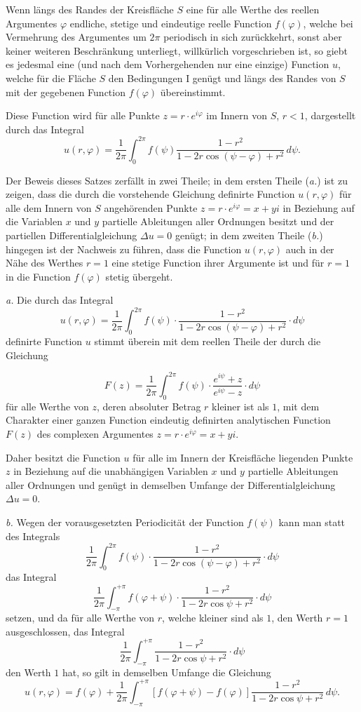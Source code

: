 \documentclass{article}
\begin{document}
Wenn längs des Randes der Kreisfläche $S$ eine für alle Werthe des reellen Argumentes $\varphi$ endliche, stetige und eindeutige reelle Function $f(\varphi)$, welche bei Vermehrung des Argumentes um $2\pi$ periodisch in sich zurückkehrt, sonst aber keiner weiteren Beschränkung unterliegt, willkürlich vorgeschrieben ist, so giebt es jedesmal eine (und nach dem Vorhergehenden nur eine einzige) Function $u$, welche für die Fläche $S$ den Bedingungen I genügt und längs des Randes von $S$ mit der gegebenen Function $f(\varphi)$ übereinstimmt.

Diese Function wird für alle Punkte $z = r \cdot e^{i\varphi}$ im Innern von $S$, $r < 1$, dargestellt durch das Integral
\[
u(r, \varphi) = \frac{1}{2\pi} \int_0^{2\pi} f(\psi) \frac{1 - r^2}{1 - 2r \cos(\psi - \varphi) + r^2}\,d\psi.
\]

Der Beweis dieses Satzes zerfällt in zwei Theile; in dem ersten Theile (\emph{a.}) ist zu zeigen, dass die durch die vorstehende Gleichung definirte Function $u(r, \varphi)$ für alle dem Innern von $S$ angehörenden Punkte $z = r \cdot e^{i\varphi} = x + yi$ in Beziehung auf die Variablen $x$ und $y$ partielle Ableitungen aller Ordnungen besitzt und der partiellen Differentialgleichung $\Delta u = 0$ genügt; in dem zweiten Theile (\emph{b.}) hingegen ist der Nachweis zu führen, dass die Function $u(r, \varphi)$ auch in der Nähe des Werthes $r = 1$ eine stetige Function ihrer Argumente ist und für $r = 1$ in die Function $f(\varphi)$ stetig übergeht.

\emph{a.} Die durch das Integral
\[
u(r, \varphi) = \frac{1}{2\pi} \int_0^{2\pi} f(\psi) \cdot \frac{1 - r^2}{1 - 2r \cos(\psi - \varphi) + r^2} \cdot d\psi
\]
definirte Function $u$ stimmt überein mit dem reellen Theile der durch die Gleichung

\[
F(z) = \frac{1}{2\pi} \int_0^{2\pi} f(\psi) \cdot \frac{e^{i\psi} + z}{e^{i\psi} - z} \cdot d\psi
\]
für alle Werthe von $z$, deren absoluter Betrag $r$ kleiner ist als $1$, mit dem Charakter einer ganzen Function eindeutig definirten analytischen Function $F(z)$ des complexen Argumentes $z = r \cdot e^{i\varphi} = x + yi$.

Daher besitzt die Function $u$ für alle im Innern der Kreisfläche liegenden Punkte $z$ in Beziehung auf die unabhängigen Variablen $x$ und $y$ partielle Ableitungen aller Ordnungen und genügt in demselben Umfange der Differentialgleichung $\Delta u = 0$.

\emph{b.} Wegen der vorausgesetzten Periodicität der Function $f(\psi)$ kann man statt des Integrals
\[
\frac{1}{2\pi} \int_0^{2\pi} f(\psi) \cdot \frac{1 - r^2}{1 - 2r \cos(\psi - \varphi) + r^2} \cdot d\psi
\]
das Integral
\[
\frac{1}{2\pi} \int_{-\pi}^{+\pi} f(\varphi + \psi) \cdot \frac{1 - r^2}{1 - 2r \cos\psi + r^2} \cdot d\psi
\]
setzen, und da für alle Werthe von $r$, welche kleiner sind als $1$, den Werth $r = 1$ ausgeschlossen, das Integral
\[
\frac{1}{2\pi} \int_{-\pi}^{+\pi} \frac{1 - r^2}{1 - 2r \cos\psi + r^2} \cdot d\psi
\]
den Werth $1$ hat, so gilt in demselben Umfange die Gleichung
\[
u(r, \varphi) = f(\varphi) + \frac{1}{2\pi} \int_{-\pi}^{+\pi} [f(\varphi + \psi) - f(\varphi)] \frac{1 - r^2}{1 - 2r \cos\psi + r^2}\,d\psi.
\]
\end{document}
